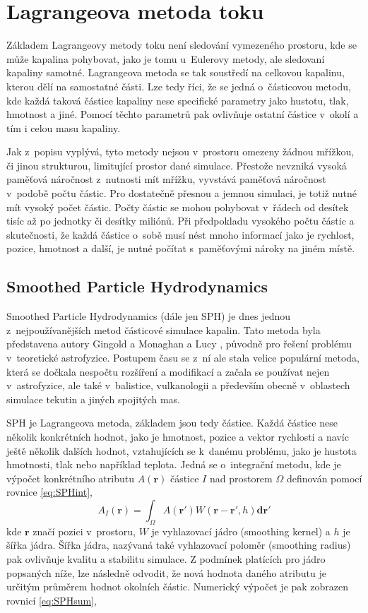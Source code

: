 \section{Lagrangeova metoda toku}
Základem Lagrangeovy metody toku není sledování vymezeného prostoru, kde se může kapalina pohybovat, jako je tomu u~Eulerovy metody, ale sledovaní kapaliny samotné. Lagrangeova metoda se tak soustředí na celkovou kapalinu, kterou dělí na samostatné části. Lze tedy říci, že se jedná o~částicovou metodu, kde každá taková částice kapaliny nese specifické parametry jako hustotu, tlak, hmotnost a jiné. Pomocí těchto parametrů pak ovlivňuje ostatní částice v~okolí a tím i celou masu kapaliny.

Jak z~popisu vyplývá, tyto metody nejsou v~prostoru omezeny žádnou mřížkou, či jinou strukturou, limitující prostor dané simulace. Přestože nevzniká vysoká paměťová náročnost z~nutnosti mít mřížku, vyvstává paměťová náročnost v~podobě počtu částic. Pro dostatečně přesnou a jemnou simulaci, je totiž nutné mít vysoký počet částic. Počty částic se mohou pohybovat v~řádech od desítek tisíc až po jednotky či desítky miliónů. Při předpokladu  vysokého počtu částic a skutečnosti, že každá částice o~sobě musí nést mnoho informací jako je rychlost, pozice, hmotnost a další, je nutné počítat s~paměťovými nároky na jiném místě.

\subsection{Smoothed Particle Hydrodynamics}
\label{chapter:SPH}
Smoothed Particle Hydrodynamics (dále jen SPH) je dnes jednou z~nejpoužívanějších metod částicové simulace kapalin. Tato metoda byla představena autory Gingold a Monaghan \cite{Monaghan77} a Lucy \cite{Lucy77}, původně pro řešení problému v~teoretické astrofyzice. Postupem času se z~ní ale stala velice populární metoda, která se dočkala nespočtu rozšíření a modifikací a začala se používat nejen v~astrofyzice, ale také v~balistice, vulkanologii a především obecně v~oblastech simulace tekutin a jiných spojitých mas.

SPH je Lagrangeova metoda, základem jsou tedy částice. Každá částice nese několik konkrétních hodnot, jako je hmotnost, pozice a vektor rychlosti a navíc ještě několik dalších hodnot, vztahujících se k~danému problému, jako je hustota hmotnosti, tlak nebo například teplota. Jedná se o~integrační metodu, kde je výpočet konkrétního atributu $A(\mathbf{r})$ částice $I$ nad prostorem $\Omega$ definován pomocí rovnice \ref{eq:SPHint},
\begin{equation}
	A_I(\mathbf{r}) = \int_\Omega A(\mathbf{r}')W(\mathbf{r} - \mathbf{r'},h)\mathbf{dr}'
	\label{eq:SPHint}
\end{equation}
kde $\mathbf{r}$ značí pozici v~prostoru, $W$ je vyhlazovací jádro (smoothing kernel) a $h$ je šířka jádra. Šířka jádra, nazývaná také vyhlazovací poloměr (smoothing radius) pak ovlivňuje kvalitu a stabilitu simulace. Z podmínek platících pro jádro popsaných níže, lze následně odvodit, že nová hodnota daného atributu je určitým průměrem hodnot okolních částic.
Numerický výpočet je pak zobrazen rovnicí \ref{eq:SPHsum},

